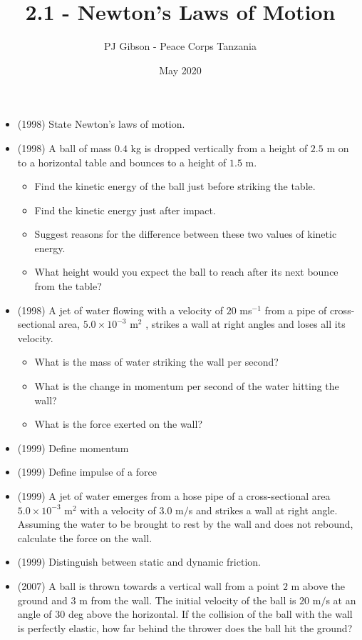 \documentclass{article}
\title{\textbf{2.1 - Newton’s Laws of Motion}}
\author{PJ Gibson - Peace Corps Tanzania}
\date{May 2020}
\begin{document}
\maketitle

\begin{itemize}
\item (1998)  State Newton's laws of motion.
\item (1998)  A ball of mass $ 0.4$ kg is dropped vertically from a height of $ 2.5$ m on to a horizontal table and bounces to a height of $ 1.5$ m.
 \begin{itemize}
\item Find the kinetic energy of the ball just before striking the table.
\item Find the kinetic energy just after impact.
\item Suggest reasons for the difference between these two values of kinetic energy.
\item What height would you expect the ball to reach after its next bounce from the table?
\end{itemize}
\item (1998)  A jet of water flowing with a velocity of $ 20$ ms$ ^{-1}$ from a pipe of cross-sectional area, $ 5.0 \times 10^{-3}$ m$ ^{2}$ , strikes a wall at right angles and loses all its velocity.
 \begin{itemize}
\item What is the mass of water striking the wall per second?
\item What is the change in momentum per second of the water hitting the wall?
\item What is the force exerted on the wall?
\end{itemize}
\item (1999)  Define momentum
\item (1999)  Define impulse of a force
\item (1999)  A jet of water emerges from a hose pipe of a cross-sectional area $ 5.0\times 10^{-3}$ m​$ ^{2}$ with a velocity of $ 3.0$ m$/$s and strikes a wall at right angle. Assuming the water to be brought to rest by the wall and does not rebound, calculate the force on the wall.
\item (1999)  Distinguish between static and dynamic friction.
\item (2007)  A ball is thrown towards a vertical wall from a point $ 2$ m above the ground and $ 3$ m from the wall.  The initial velocity of the ball is $ 20$ m$/$s at an angle of $ 30$ deg above the horizontal.  If the collision of the ball with the wall is perfectly elastic, how far behind the thrower does the ball hit the ground?

\end{itemize}
\end{document}
